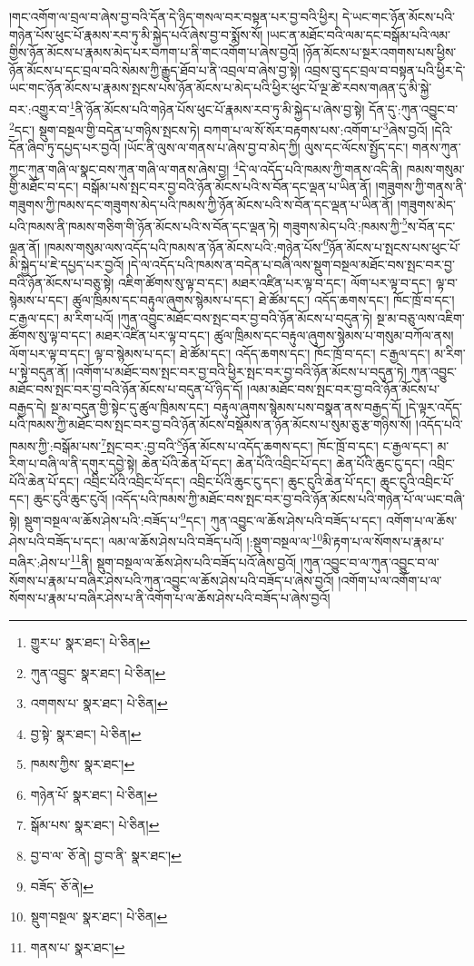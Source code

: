 །གང་འགོག་ལ་བྲལ་བ་ཞེས་བྱ་བའི་དོན་དེ་ཉིད་གསལ་བར་བསྟན་པར་བྱ་བའི་ཕྱིར། དེ་ཡང་གང་ཉོན་མོངས་པའི་གཉེན་པོས་ཕུང་པོ་རྣམས་རབ་ཏུ་མི་སྐྱེད་པའོ་ཞེས་བྱ་བ་སྨོས་སོ། །ཡང་ན་མཐོང་བའི་ལམ་དང་བསྒོམ་པའི་ལམ་གྱིས་ཉོན་མོངས་པ་རྣམས་མེད་པར་བཀག་པ་ནི་གང་འགོག་པ་ཞེས་བྱའོ། །ཉོན་མོངས་པ་སྔར་འགགས་པས་ཕྱིས་ཉོན་མོངས་པ་དང་བྲལ་བའི་སེམས་ཀྱི་རྒྱུད་ཐོབ་པ་ནི་འབྲལ་བ་ཞེས་བྱ་སྟེ། འབྲས་བུ་དང་བྲལ་བ་བསྟན་པའི་ཕྱིར་དེ་ཡང་གང་ཉོན་མོངས་པ་རྣམས་སྤངས་པས་ཉོན་མོངས་པ་མེད་པའི་ཕྱིར་ཕུང་པོ་ལྔ་ཚེ་རབས་གཞན་དུ་མི་སྐྱེ་བར་:འགྱུར་བ་\footnote{གྱུར་པ་  སྣར་ཐང་།  པེ་ཅིན། }ནི་ཉོན་མོངས་པའི་གཉེན་པོས་ཕུང་པོ་རྣམས་རབ་ཏུ་མི་སྐྱེད་པ་ཞེས་བྱ་སྟེ། དོན་དུ་:ཀུན་འབྱུང་བ་\footnote{ཀུན་འབྱུང་  སྣར་ཐང་།  པེ་ཅིན། }དང་། སྡུག་བསྔལ་གྱི་བདེན་པ་གཉིས་སྤངས་ཏེ། བཀག་པ་ལ་སོ་སོར་བརྟགས་པས་:འགོག་པ་\footnote{འགགས་པ་  སྣར་ཐང་།  པེ་ཅིན། }ཞེས་བྱའོ། །དེའི་དོན་ཞིབ་ཏུ་དཔྱད་པར་བྱའོ། །ཡོང་ནི་ལུས་ལ་གནས་པ་ཞེས་བྱ་བ་མེད་ཀྱི། ལུས་དང་ལོངས་སྤྱོད་དང་། གནས་ཀུན་ཀྱང་ཀུན་གཞི་ལ་སྣང་བས་ཀུན་གཞི་ལ་གནས་ཞེས་བྱ། \footnote{བྱ་སྟེ་  སྣར་ཐང་།  པེ་ཅིན། }དེ་ལ་འདོད་པའི་ཁམས་ཀྱི་གནས་འདི་ནི། ཁམས་གསུམ་གྱི་མཐོང་བ་དང་། བསྒོམ་པས་སྤང་བར་བྱ་བའི་ཉོན་མོངས་པའི་ས་བོན་དང་ལྡན་པ་ཡིན་ནོ། །གཟུགས་ཀྱི་གནས་ནི་གཟུགས་ཀྱི་ཁམས་དང་གཟུགས་མེད་པའི་ཁམས་ཀྱི་ཉོན་མོངས་པའི་ས་བོན་དང་ལྡན་པ་ཡིན་ནོ། །གཟུགས་མེད་པའི་ཁམས་ནི་ཁམས་གཅིག་གི་ཉོན་མོངས་པའི་ས་བོན་དང་ལྡན་ཏེ། གཟུགས་མེད་པའི་:ཁམས་ཀྱི་\footnote{ཁམས་ཀྱིས་  སྣར་ཐང་། }ས་བོན་དང་ལྡན་ནོ། །ཁམས་གསུམ་ལས་འདོད་པའི་ཁམས་ན་ཉོན་མོངས་པའི་:གཉེན་པོས་\footnote{གཉེན་པོ་  སྣར་ཐང་།  པེ་ཅིན། }ཉོན་མོངས་པ་སྤངས་པས་ཕུང་པོ་མི་སྐྱེད་པ་ཇེ་དཔྱད་པར་བྱའོ། །དེ་ལ་འདོད་པའི་ཁམས་ན་བདེན་པ་བཞི་ལས་སྡུག་བསྔལ་མཐོང་བས་སྤང་བར་བྱ་བའི་ཉོན་མོངས་པ་བཅུ་སྟེ། འཇིག་ཚོགས་སུ་ལྟ་བ་དང་། མཐར་འཛིན་པར་ལྟ་བ་དང་། ལོག་པར་ལྟ་བ་དང་། ལྟ་བ་སྙེམས་པ་དང་། ཚུལ་ཁྲིམས་དང་བརྟུལ་ཞུགས་སྙེམས་པ་དང་། ཐེ་ཚོམ་དང་། འདོད་ཆགས་དང་། ཁོང་ཁྲོ་བ་དང་། ང་རྒྱལ་དང་། མ་རིག་པའོ། །ཀུན་འབྱུང་མཐོང་བས་སྤང་བར་བྱ་བའི་ཉོན་མོངས་པ་བདུན་ཏེ། སྔ་མ་བཅུ་ལས་འཇིག་ཚོགས་སུ་ལྟ་བ་དང་། མཐར་འཛིན་པར་ལྟ་བ་དང་། ཚུལ་ཁྲིམས་དང་བརྟུལ་ཞུགས་སྙེམས་པ་གསུམ་བཀོལ་ནས། ལོག་པར་ལྟ་བ་དང་། ལྟ་བ་སྙེམས་པ་དང་། ཐེ་ཚོམ་དང་། འདོད་ཆགས་དང་། ཁོང་ཁྲོ་བ་དང་། ང་རྒྱལ་དང་། མ་རིག་པ་སྟེ་བདུན་ནོ། །འགོག་པ་མཐོང་བས་སྤང་བར་བྱ་བའི་ཕྱིར་སྤང་བར་བྱ་བའི་ཉོན་མོངས་པ་བདུན་ཏེ། ཀུན་འབྱུང་མཐོང་བས་སྤང་བར་བྱ་བའི་ཉོན་མོངས་པ་བདུན་པོ་ཉིད་དོ། །ལམ་མཐོང་བས་སྤང་བར་བྱ་བའི་ཉོན་མོངས་པ་བརྒྱད་དེ། སྔ་མ་བདུན་གྱི་སྟེང་དུ་ཚུལ་ཁྲིམས་དང་། བརྟུལ་ཞུགས་སྙེམས་པས་བསྣན་ནས་བརྒྱད་དོ། །དེ་ལྟར་འདོད་པའི་ཁམས་ཀྱི་མཐོང་བས་སྤང་བར་བྱ་བའི་ཉོན་མོངས་བསྡོམས་ན་ཉོན་མོངས་པ་སུམ་ཅུ་རྩ་གཉིས་སོ། །འདོད་པའི་ཁམས་ཀྱི་:བསྒོམ་པས་\footnote{སྒོམ་པས་  སྣར་ཐང་།  པེ་ཅིན། }སྤང་བར་:བྱ་བའི་\footnote{བྱ་བ་ལ་  ཅོ་ནེ། བྱ་བ་ནི་  སྣར་ཐང་། }ཉོན་མོངས་པ་འདོད་ཆགས་དང་། ཁོང་ཁྲོ་བ་དང་། ང་རྒྱལ་དང་། མ་རིག་པ་བཞི་ལ་ནི་དགུར་དབྱེ་སྟེ། ཆེན་པོའི་ཆེན་པོ་དང་། ཆེན་པོའི་འབྲིང་པོ་དང་། ཆེན་པོའི་ཆུང་ངུ་དང་། འབྲིང་པོའི་ཆེན་པོ་དང་། འབྲིང་པོའི་འབྲིང་པོ་དང་། འབྲིང་པོའི་ཆུང་ངུ་དང་། ཆུང་ངུའི་ཆེན་པོ་དང་། ཆུང་ངུའི་འབྲིང་པོ་དང་། ཆུང་ངུའི་ཆུང་ངུའོ། །འདོད་པའི་ཁམས་ཀྱི་མཐོང་བས་སྤང་བར་བྱ་བའི་ཉོན་མོངས་པའི་གཉེན་པོ་ལ་ཡང་བཞི་སྟེ། སྡུག་བསྔལ་ལ་ཆོས་ཤེས་པའི་:བཟོད་པ་\footnote{བཟོད་  ཅོ་ནེ། }དང་། ཀུན་འབྱུང་ལ་ཆོས་ཤེས་པའི་བཟོད་པ་དང་། འགོག་པ་ལ་ཆོས་ཤེས་པའི་བཟོད་པ་དང་། ལམ་ལ་ཆོས་ཤེས་པའི་བཟོད་པའོ། །:སྡུག་བསྔལ་ལ་\footnote{སྡུག་བསྔལ་  སྣར་ཐང་།  པེ་ཅིན། }མི་རྟག་པ་ལ་སོགས་པ་རྣམ་པ་བཞིར་:ཤེས་པ་\footnote{གནས་པ་  སྣར་ཐང་། }ནི། སྡུག་བསྔལ་ལ་ཆོས་ཤེས་པའི་བཟོད་པའོ་ཞེས་བྱའོ། །ཀུན་འབྱུང་བ་ལ་ཀུན་འབྱུང་བ་ལ་སོགས་པ་རྣམ་པ་བཞིར་ཤེས་པའི་ཀུན་འབྱུང་ལ་ཆོས་ཤེས་པའི་བཟོད་པ་ཞེས་བྱའོ། །འགོག་པ་ལ་འགོག་པ་ལ་སོགས་པ་རྣམ་པ་བཞིར་ཤེས་པ་ནི་འགོག་པ་ལ་ཆོས་ཤེས་པའི་བཟོད་པ་ཞེས་བྱའོ། 